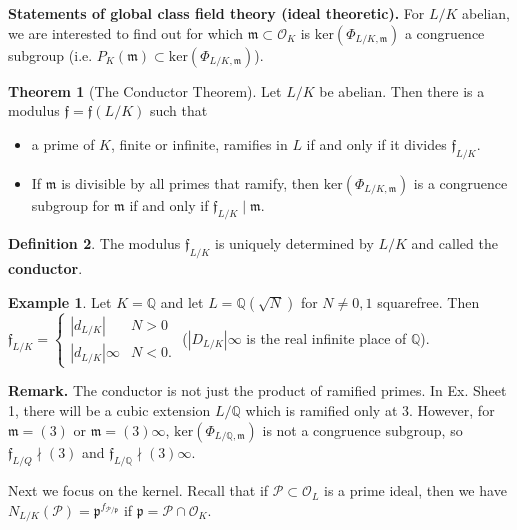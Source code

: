 \documentclass{article}
\theoremstyle{definition}
\newtheorem{theorem}{Theorem}[section]
\newtheorem{example}{Example}[section]
\newtheorem{defn}[theorem]{Definition}
\begin{document}
\textbf{Statements of global class field theory (ideal theoretic).} For $L/K$ abelian, we are interested to find out for which $\mathfrak{m} \subset \mathcal{O}_K$ is $\text{ker}(\Phi_{L/K,\mathfrak{m}})$ a congruence subgroup (i.e. $P_K(\mathfrak{m}) \subset \text{ker}(\Phi_{L/K, \mathfrak{m}})$).
\begin{theorem}[The Conductor Theorem]
    Let $L/K$ be abelian. Then there is a modulus $\mathfrak{f}=\mathfrak{f}(L/K)$ such that 
    \begin{itemize}
        \item a prime of $K$, finite or infinite, ramifies in $L$ if and only if it divides $\mathfrak{f}_{L/K}$.
        \item If $\mathfrak{m}$ is divisible by all primes that ramify, then $\text{ker}(\Phi_{L/K, \mathfrak{m}})$ is a congruence subgroup for $\mathfrak{m}$ if and only if $\mathfrak{f}_{L/K} \mid \mathfrak{m}$.
    \end{itemize}
\end{theorem}
\begin{defn}
    The modulus $\mathfrak{f}_{L/K}$ is uniquely determined by $L/K$ and called the \textbf{conductor}.
\end{defn}
\begin{example}
    Let $K=\mathbb{Q}$ and let $L = \mathbb{Q}(\sqrt{N})$ for $N \neq 0,1$ squarefree. Then $\mathfrak{f}_{L/K} = \begin{cases}
        \left|d_{L/K} \right| & N>0\\
        \left|d_{L/K} \right|{\infty} & N<0.
    \end{cases}$ ($\left|D_{L/K}\right|{\infty}$ is the real infinite place of $\mathbb{Q}$).
\end{example}
\textbf{Remark.} The conductor is not just the product of ramified primes. In Ex. Sheet 1, there will be a cubic extension $L/\mathbb{Q}$ which is ramified only at 3. However, for $\mathfrak{m} = (3)$ or $\mathfrak{m} = (3)\infty$, $\text{ker}(\Phi_{L/\mathbb{Q},\mathfrak{m}})$ is not a congruence subgroup, so $\mathfrak{f}_{L/Q}\nmid (3)$ and $\mathfrak{f}_{L/\mathbb{Q}}\nmid (3)\infty$.
\vspace{1mm}
 
Next we focus on the kernel. Recall that if $\mathcal{P} \subset \mathcal{O}_L$ is a prime ideal, then we have $N_{L/K}(\mathcal{P}) = \mathfrak{p}^{f_{\mathcal{P}/\mathfrak{p}}}$ if $\mathfrak{p} = \mathcal{P} \cap \mathcal{O}_K$.
\vspace{1mm}
 
\end{document}
